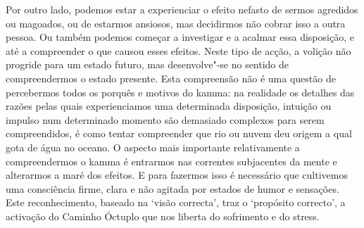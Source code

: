 Por outro lado, podemos estar a experienciar o efeito nefasto de sermos
agredidos ou magoados, ou de estarmos ansiosos, mas decidirmos não cobrar isso a
outra pessoa. Ou também podemos começar a investigar e a acalmar essa
disposição, e até a compreender o que causou esses efeitos. Neste tipo de acção,
a volição não progride para um estado futuro, mas desenvolve"-se no sentido de
compreendermos o estado presente. Esta compreensão não é uma questão de
percebermos todos os porquês e motivos do kamma: na realidade os detalhes das
razões pelas quais experienciamos uma determinada disposição, intuição ou
impulso num determinado momento são demasiado complexos para serem
compreendidos, é como tentar compreender que rio ou nuvem deu origem a qual gota
de água no oceano.
O aspecto mais importante relativamente a compreendermos o kamma é
entrarmos nas correntes subjacentes da mente e alterarmos a maré dos efeitos. E
para fazermos isso é necessário que cultivemos uma consciência firme, clara e
não agitada por estados de humor e sensações. Este reconhecimento, baseado na
`visão correcta', traz o `propósito correcto', a activação do Caminho Óctuplo
que nos liberta do sofrimento e do stress.

